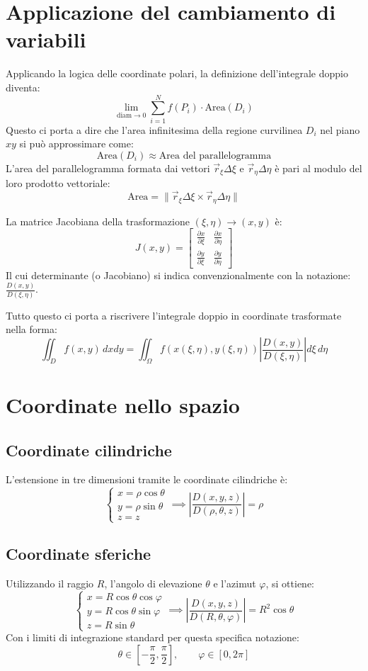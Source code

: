 \section{Applicazione del cambiamento di variabili}
Applicando la logica delle coordinate polari, la definizione dell'integrale doppio diventa:
\[
\lim_{\text{diam} \to 0} \sum_{i=1}^{N} f(P_i) \cdot \text{Area}(D_i)
\]
Questo ci porta a dire che l'area infinitesima della regione curvilinea $D_i$ nel piano $xy$ si può approssimare come:
\[
\text{Area}(D_i) \approx \text{Area del parallelogramma}
\]
L'area del parallelogramma formata dai vettori $\vec{r}_\xi \Delta\xi$ e $\vec{r}_\eta \Delta\eta$ è pari al modulo del loro prodotto vettoriale:
\[
\text{Area} = \|\vec{r}_\xi \Delta\xi \times \vec{r}_\eta \Delta\eta\|
\]

La matrice Jacobiana della trasformazione $(\xi, \eta) \to (x, y)$ è:
\[
J(x,y) = 
\begin{bmatrix}
\frac{\partial x}{\partial \xi} & \frac{\partial x}{\partial \eta} \\
\frac{\partial y}{\partial \xi} & \frac{\partial y}{\partial \eta}
\end{bmatrix}
\]
Il cui determinante (o Jacobiano) si indica convenzionalmente con la notazione: $\frac{D(x,y)}{D(\xi,\eta)}$.

Tutto questo ci porta a riscrivere l'integrale doppio in coordinate trasformate nella forma:
\[
\iint_D f(x,y) \, dx dy = \iint_\Omega f(x(\xi,\eta), y(\xi,\eta)) \left| \frac{D(x,y)}{D(\xi,\eta)} \right| d\xi \, d\eta
\]

\section{Coordinate nello spazio}

\subsection{Coordinate cilindriche}
L'estensione in tre dimensioni tramite le coordinate cilindriche è:
\[
\begin{cases}
x = \rho \cos\theta \\
y = \rho \sin\theta \\
z = z
\end{cases}
\implies \left| \frac{D(x,y,z)}{D(\rho,\theta,z)} \right| = \rho
\]

\subsection{Coordinate sferiche}
Utilizzando il raggio $R$, l'angolo di elevazione $\theta$ e l'azimut $\varphi$, si ottiene:
\[
\begin{cases}
x = R \cos\theta \cos\varphi \\
y = R \cos\theta \sin\varphi \\
z = R \sin\theta
\end{cases}
\implies \left| \frac{D(x,y,z)}{D(R,\theta,\varphi)} \right| = R^2 \cos\theta
\]
Con i limiti di integrazione standard per questa specifica notazione:
\[
\theta \in \left[-\frac{\pi}{2}, \frac{\pi}{2}\right], \qquad \varphi \in [0, 2\pi]
\]

